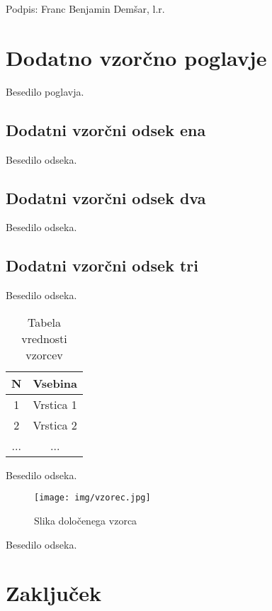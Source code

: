 \documentclass[a4paper,12pt]{report}
\newcommand{\tretjiavtor} {Franc Benjamin Demšar}
\begin{document}
Podpis: {\tretjiavtor}, l.r.

\chapter{Dodatno vzorčno poglavje}

Besedilo poglavja.

\section{Dodatni vzorčni odsek ena}

Besedilo odseka.

\section{Dodatni vzorčni odsek dva}

Besedilo odseka.

\section{Dodatni vzorčni odsek tri}

Besedilo odseka.

\begin{table}[htb]
 \centering
 \begin{tabular}{c || c}
  \textbf{N} & Vsebina\\ \hline\hline
  1 & Vrstica 1\\        \hline
  2 & Vrstica 2\\        \hline
  ... & ... \\
\end{tabular}
\caption{Tabela vrednosti vzorcev}
\label{tab:1}
\end{table}

Besedilo odseka.

\begin{figure}[htb]
	\centering
	\texttt{[image: img/vzorec.jpg]}
	\caption{Slika določenega vzorca}
\label{fig:1}
\end{figure}

Besedilo odseka.

\chapter{Zaključek}
\end{document}
